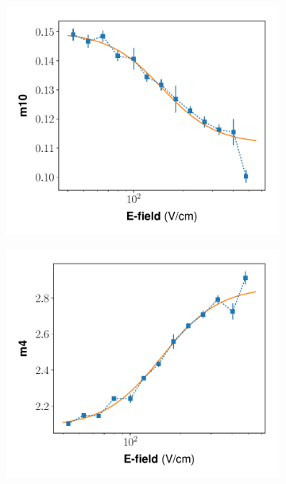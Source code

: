\begin{figure}[h!]
\centering
\begin{subfigure}{0.45\textwidth}
  \centering
  \includegraphics[width=\textwidth]{Figures/Yields_fit_old/NEST_m10_fit_old.pdf}
  \caption{}
\end{subfigure}%
\begin{subfigure}{0.45\textwidth}
  \centering
  \includegraphics[width=\textwidth]{Figures/Yields_fit_old/NEST_m4_fit_old.pdf}
  \caption{}
\end{subfigure}

\end{figure}
